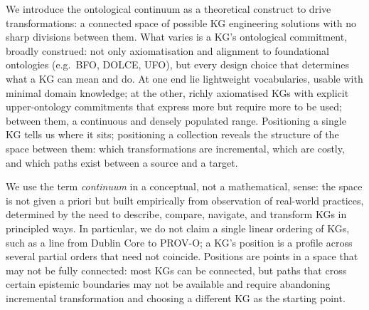 \documentclass[runningheads]{llncs}
\newenvironment{onlyshort}{\ignorespaces}{\ignorespacesafterend}
\begin{document}
\begin{onlyshort}
We introduce the ontological continuum as a theoretical construct 
to drive transformations: a connected space of possible KG engineering solutions with no sharp divisions between them. 
What varies is a KG's ontological commitment, broadly construed: not only axiomatisation and alignment to foundational ontologies (e.g.\ BFO, DOLCE, UFO), but every design choice that determines what a KG can mean and do.
At one end lie lightweight vocabularies, usable with minimal domain knowledge; at the other, richly axiomatised KGs with explicit upper-ontology commitments that express more but require more to be used; between them, a continuous and densely populated range.
Positioning a single KG tells us where it sits; positioning a collection reveals the structure of the 
space between them: which transformations are incremental, 
which are costly, and which paths exist between a source and a 
target.

We use the term \emph{continuum} in a conceptual, not a 
mathematical, sense: the space is not given a priori but built empirically from observation of real-world practices, determined by the need to describe, compare, navigate, and transform KGs in principled ways. 
In particular, we do not claim a single linear ordering of KGs, such as a line from Dublin Core to PROV-O; a KG's position is a profile across several partial orders that need not coincide.
Positions are points in a space that may not be fully connected: most KGs can be connected, but paths that cross certain epistemic boundaries may not be available and require abandoning incremental transformation and choosing a different KG as the starting point.
\end{onlyshort}
\end{document}
